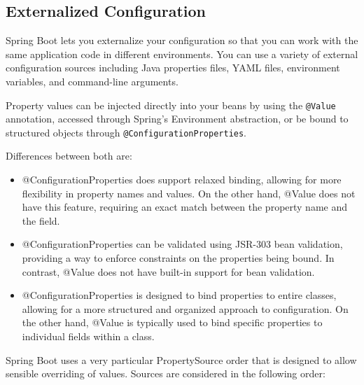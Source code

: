 \documentclass{scrartcl}
\begin{document}
\subsection{Externalized Configuration}

Spring Boot lets you externalize your configuration so that you can work with the same application code in different environments. You can use a variety of external configuration sources including Java properties files, YAML files, environment variables, and command-line arguments.

Property values can be injected directly into your beans by using the \lstinline |@Value| annotation, accessed through Spring’s Environment abstraction, or be bound to structured objects through \lstinline[]|@ConfigurationProperties|.

Differences between both are:

\begin{itemize}
    \item @ConfigurationProperties does support relaxed binding, allowing for more flexibility in property names and values. On the other hand, @Value does not have this feature, requiring an exact match between the property name and the field.
    \item @ConfigurationProperties can be validated using JSR-303 bean validation, providing a way to enforce constraints on the properties being bound. In contrast, @Value does not have built-in support for bean validation.
    \item @ConfigurationProperties is designed to bind properties to entire classes, allowing for a more structured and organized approach to configuration. On the other hand, @Value is typically used to bind specific properties to individual fields within a class.
\end{itemize}

Spring Boot uses a very particular PropertySource order that is designed to allow sensible overriding of values. Sources are considered in the following order:
\end{document}
